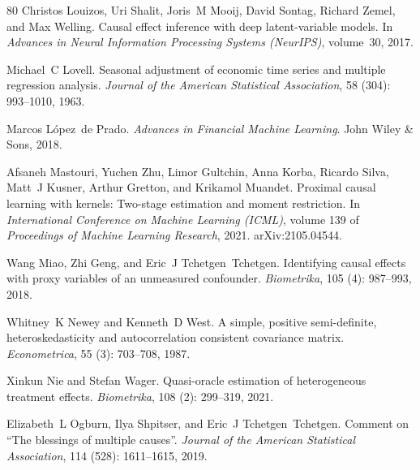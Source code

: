 \begin{thebibliography}{80}
Christos Louizos, Uri Shalit, Joris~M Mooij, David Sontag, Richard Zemel, and Max Welling.
\newblock Causal effect inference with deep latent-variable models.
\newblock In \emph{Advances in Neural Information Processing Systems (NeurIPS)}, volume~30, 2017.

Michael~C Lovell.
\newblock Seasonal adjustment of economic time series and multiple regression analysis.
\newblock \emph{Journal of the American Statistical Association}, 58 (304): 993--1010, 1963.

Marcos L{\'o}pez~de Prado.
\newblock \emph{Advances in Financial Machine Learning}.
\newblock John Wiley \& Sons, 2018.

Afsaneh Mastouri, Yuchen Zhu, Limor Gultchin, Anna Korba, Ricardo Silva, Matt~J Kusner, Arthur Gretton, and Krikamol Muandet.
\newblock Proximal causal learning with kernels: Two-stage estimation and moment restriction.
\newblock In \emph{International Conference on Machine Learning (ICML)}, volume 139 of \emph{Proceedings of Machine Learning Research}, 2021.
\newblock arXiv:2105.04544.

Wang Miao, Zhi Geng, and Eric~J Tchetgen~Tchetgen.
\newblock Identifying causal effects with proxy variables of an unmeasured confounder.
\newblock \emph{Biometrika}, 105 (4): 987--993, 2018.

Whitney~K Newey and Kenneth~D West.
\newblock A simple, positive semi-definite, heteroskedasticity and autocorrelation consistent covariance matrix.
\newblock \emph{Econometrica}, 55 (3): 703--708, 1987.

Xinkun Nie and Stefan Wager.
\newblock Quasi-oracle estimation of heterogeneous treatment effects.
\newblock \emph{Biometrika}, 108 (2): 299--319, 2021.

Elizabeth~L Ogburn, Ilya Shpitser, and Eric~J Tchetgen~Tchetgen.
\newblock Comment on ``{T}he blessings of multiple causes''.
\newblock \emph{Journal of the American Statistical Association}, 114 (528): 1611--1615, 2019.


\end{thebibliography}
